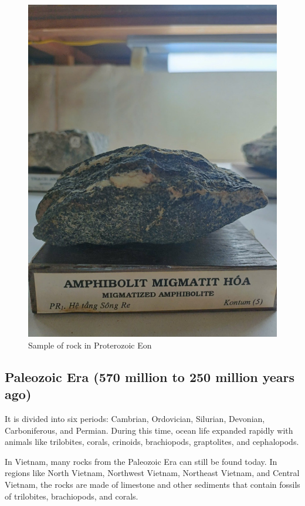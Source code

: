 \begin{figure}[H]
  \centering
  \includegraphics[max width=0.8\linewidth]{graphics/figure_03.jpg}
  \caption{Sample of rock in Proterozoic Eon}
  \label{fig:proterozoic-rock}
\end{figure}

\subsection{Paleozoic Era (570 million to 250 million years ago)}
\label{subsec:paleozoic}

It is divided into six periods: Cambrian, Ordovician, Silurian, Devonian, Carboniferous, and Permian. During this time, ocean life expanded rapidly with animals like trilobites, corals, crinoids, brachiopods, graptolites, and cephalopods.

In Vietnam, many rocks from the Paleozoic Era can still be found today. In regions like North Vietnam, Northwest Vietnam, Northeast Vietnam, and Central Vietnam, the rocks are made of limestone and other sediments that contain fossils of trilobites, brachiopods, and corals.

